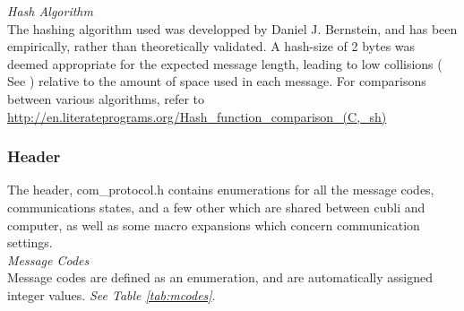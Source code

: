 \textit{Hash Algorithm}\\

The hashing algorithm used was developped by Daniel J. Bernstein, and has been empirically, rather than theoretically validated. A hash-size of 2 bytes was deemed appropriate for the expected message length, leading to low collisions ( See \cite{hashing} ) relative to the amount of space used in each message. For comparisons between various algorithms, refer to \url{http://en.literateprograms.org/Hash_function_comparison_(C,_sh)}

\subsubsection{Header}

The header, com\_protocol.h contains enumerations for all the message codes, communications states, and a few other which are shared between cubli and computer, as well as some macro expansions which concern communication settings.\\

\textit{Message Codes}\\

Message codes are defined as an enumeration, and are automatically assigned integer values. \textit{See Table \ref{tab:mcodes}}.\\

